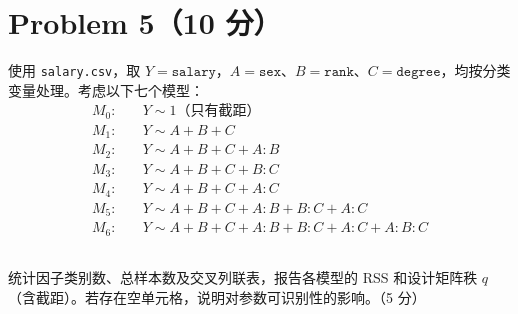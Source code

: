 \documentclass[12pt,a4paper]{article}
\begin{document}
\section{Problem 5（10 分）}

使用 \texttt{salary.csv}，取 $Y=\texttt{salary}$，$A=\texttt{sex}$、$B=\texttt{rank}$、$C=\texttt{degree}$，均按分类变量处理。考虑以下七个模型：
\[
\begin{aligned}
M_0:\quad & Y \sim 1 \text{（只有截距）} \\
M_1:\quad & Y \sim A+B+C \\
M_2:\quad & Y \sim A+B+C+A{:}B \\
M_3:\quad & Y \sim A+B+C+B{:}C \\
M_4:\quad & Y \sim A+B+C+A{:}C \\
M_5:\quad & Y \sim A+B+C+A{:}B+B{:}C+A{:}C \\
M_6:\quad & Y \sim A+B+C+A{:}B+B{:}C+A{:}C+A{:}B{:}C
\end{aligned}
\]

\subsection{}

统计因子类别数、总样本数及交叉列联表，报告各模型的 RSS 和设计矩阵秩 $q$（含截距）。若存在空单元格，说明对参数可识别性的影响。（5 分）
\end{document}
